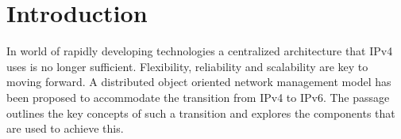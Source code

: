 
%
\section{Introduction}
\par{
In world of rapidly developing technologies a centralized architecture that IPv4 uses is no longer sufficient. Flexibility, reliability and scalability are key to moving forward. A distributed object oriented network management model has been proposed to accommodate the transition from IPv4 to IPv6. 
The passage outlines the key concepts of such a transition and explores the components that are used to achieve this.}
\\
%